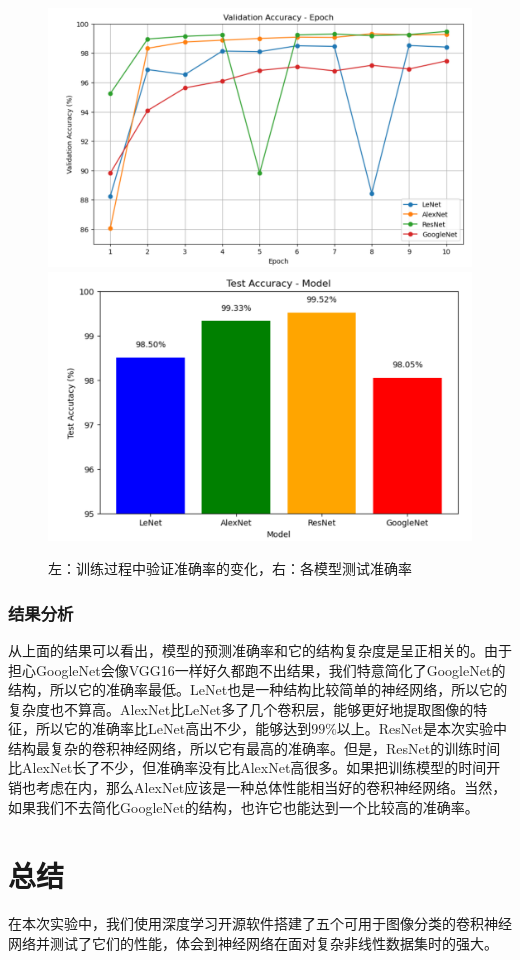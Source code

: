 \documentclass{article}
\begin{document}
\begin{figure}[h]
    \lefting
    \includegraphics[width=0.5\linewidth]{ValAcc.png}
    \label{fig:enter-label}
    \righting
    \includegraphics[width=0.5\linewidth]{TestRes.png}
    \caption{左：训练过程中验证准确率的变化，右：各模型测试准确率}
    \label{fig:enter-label}
\end{figure}
\subsubsection{结果分析}
从上面的结果可以看出，模型的预测准确率和它的结构复杂度是呈正相关的。由于担心GoogleNet会像VGG16一样好久都跑不出结果，我们特意简化了GoogleNet的结构，所以它的准确率最低。LeNet也是一种结构比较简单的神经网络，所以它的复杂度也不算高。AlexNet比LeNet多了几个卷积层，能够更好地提取图像的特征，所以它的准确率比LeNet高出不少，能够达到$99\%$以上。ResNet是本次实验中结构最复杂的卷积神经网络，所以它有最高的准确率。但是，ResNet的训练时间比AlexNet长了不少，但准确率没有比AlexNet高很多。如果把训练模型的时间开销也考虑在内，那么AlexNet应该是一种总体性能相当好的卷积神经网络。当然，如果我们不去简化GoogleNet的结构，也许它也能达到一个比较高的准确率。

\section{总结}
在本次实验中，我们使用深度学习开源软件搭建了五个可用于图像分类的卷积神经网络并测试了它们的性能，体会到神经网络在面对复杂非线性数据集时的强大。
\end{document}
